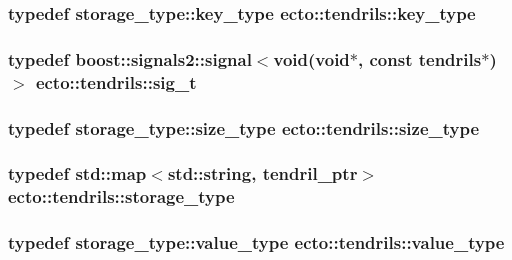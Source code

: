 \hypertarget{classecto_1_1tendrils_aa6165c6ab72d93cd56796ea81e450245}{
\subsubsection[{key\-\_\-type}]{\setlength{\rightskip}{0pt plus 5cm}typedef storage\-\_\-type\-::key\-\_\-type {\bf ecto\-::tendrils\-::key\-\_\-type}}}\label{classecto_1_1tendrils_aa6165c6ab72d93cd56796ea81e450245}
\hypertarget{classecto_1_1tendrils_aca7990b4d8ccfbddfb4d5c805345ca23}{
\subsubsection[{sig\-\_\-t}]{\setlength{\rightskip}{0pt plus 5cm}typedef boost\-::signals2\-::signal$<$void(void$\ast$, const {\bf tendrils}$\ast$)$>$ {\bf ecto\-::tendrils\-::sig\-\_\-t}\hspace{0.3cm}{\ttfamily [private]}}}\label{classecto_1_1tendrils_aca7990b4d8ccfbddfb4d5c805345ca23}
\hypertarget{classecto_1_1tendrils_af3726f822a4fd60a1095bba31f1926ef}{
\subsubsection[{size\-\_\-type}]{\setlength{\rightskip}{0pt plus 5cm}typedef storage\-\_\-type\-::size\-\_\-type {\bf ecto\-::tendrils\-::size\-\_\-type}}}\label{classecto_1_1tendrils_af3726f822a4fd60a1095bba31f1926ef}
\hypertarget{classecto_1_1tendrils_a3647503829f1b29de220584d265c63fb}{
\subsubsection[{storage\-\_\-type}]{\setlength{\rightskip}{0pt plus 5cm}typedef std\-::map$<$std\-::string, {\bf tendril\-\_\-ptr}$>$ {\bf ecto\-::tendrils\-::storage\-\_\-type}}}\label{classecto_1_1tendrils_a3647503829f1b29de220584d265c63fb}
\hypertarget{classecto_1_1tendrils_a736870868e76890e198448924cecdd4f}{
\subsubsection[{value\-\_\-type}]{\setlength{\rightskip}{0pt plus 5cm}typedef storage\-\_\-type\-::value\-\_\-type {\bf ecto\-::tendrils\-::value\-\_\-type}}}\label{classecto_1_1tendrils_a736870868e76890e198448924cecdd4f}


